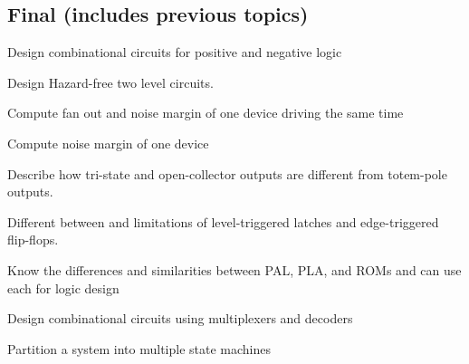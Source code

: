 \documentclass[options]{article}
\newcommand{\cmark}{\ding{51}}%
\newcommand{\done}{\rlap{$\square$}{\raisebox{2pt}{\large\hspace{1pt}\cmark}}%
  \hspace{-2.5pt}}
\begin{document}
\subsection{Final (includes previous topics)}
\begin{todolist}
  \item  Design combinational circuits for positive and negative logic
  \item  Design Hazard-free two level circuits.
  \item Compute fan out and noise margin of one device driving the same time
  \item Compute noise margin of one device
  \item Describe how tri-state and open-collector outputs are different from totem-pole outputs.
  \item Different between and limitations of level-triggered latches and edge-triggered flip-flops.
  \item Know the differences and similarities between PAL, PLA, and ROMs and can use each for logic design
  \item Design combinational circuits using multiplexers and decoders
  \item Partition a system into multiple state machines
\end{todolist}

\end{document}
